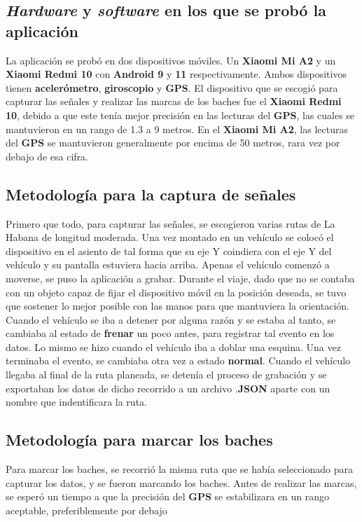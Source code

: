 	\subsection{\emph{Hardware} y \emph{software} en los que se probó la aplicación}
		La aplicación se probó en dos dispositivos móviles. Un \textbf{Xiaomi Mi A2} y un \textbf{Xiaomi Redmi 10} con \textbf{Android 9} y
		\textbf{11} respectivamente. Ambos dispositivos tienen \textbf{acelerómetro}, \textbf{giroscopio} y \textbf{GPS}. El dispositivo que 
		se escogió para capturar las señales y realizar las marcas de los baches fue el \textbf{Xiaomi Redmi 10}, debido a que este tenía mejor
		precisión en las lecturas del \textbf{GPS}, las cuales se mantuvieron en un rango de 1.3 a 9 metros. En el \textbf{Xiaomi Mi A2}, las 
		lecturas del \textbf{GPS} se mantuvieron generalmente por encima de 50 metros, rara vez por debajo de esa cifra.

	\subsection{Metodología para la captura de señales}
		Primero que todo, para capturar las señales, se escogieron varias rutas de La Habana de longitud moderada. Una vez montado en un vehículo
		se colocó el dispositivo en el asiento de tal forma que su eje Y coindiera con el eje Y del vehículo y su pantalla estuviera hacia arriba.
		Apenas el vehículo comenzó a moverse, se puso la aplicación a grabar. Durante el viaje, dado que no se contaba con un objeto capaz de fijar el
		dispositivo móvil en la posición deseada, se tuvo que sostener lo mejor posible con las manos para que mantuviera la orientación. \\
		\indent Cuando el vehículo se iba a detener por alguna razón y se estaba al tanto, se cambiaba al estado de \textbf{frenar} un poco antes, para
		registrar tal evento en los datos. Lo mismo se hizo cuando el vehículo iba a doblar una esquina. Una vez terminaba el evento, se cambiaba otra
		vez a estado \textbf{normal}. Cuando el vehículo llegaba al final de la ruta planeada, se detenía el proceso de grabación y se exportaban los
		datos de dicho recorrido a un archivo .\textbf{JSON} aparte con un nombre que indentificara la ruta.

	\subsection{Metodología para marcar los baches}
		Para marcar los baches, se recorrió la misma ruta que se había seleccionado para capturar los datos, y se fueron marcando los baches. Antes 
		de realizar las marcas, se esperó un tiempo a que la precisión del \textbf{GPS} se estabilizara en un rango aceptable, preferiblemente por debajo 
	

